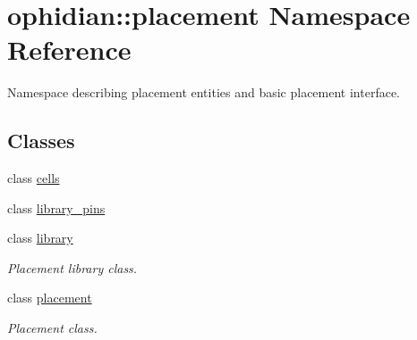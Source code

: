 \hypertarget{namespaceophidian_1_1placement}{\section{ophidian\-:\-:placement Namespace Reference}
\label{namespaceophidian_1_1placement}
}


Namespace describing placement entities and basic placement interface.  


\subsection*{Classes}
\begin{DoxyCompactItemize}
\item 
class \hyperlink{classophidian_1_1placement_1_1cells}{cells}
\item 
class \hyperlink{classophidian_1_1placement_1_1library__pins}{library\-\_\-pins}
\item 
class \hyperlink{classophidian_1_1placement_1_1library}{library}
\begin{DoxyCompactList}\small\item\em Placement library class. \end{DoxyCompactList}\item 
class \hyperlink{classophidian_1_1placement_1_1placement}{placement}
\begin{DoxyCompactList}\small\item\em Placement class. \end{DoxyCompactList}\end{DoxyCompactItemize}

